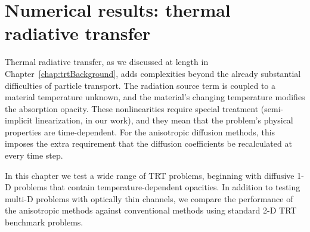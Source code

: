 \chapter{Numerical results: thermal radiative transfer}
\label{chap:trtNumericalResults}

Thermal radiative transfer, as we discussed at length in
Chapter~\ref{chap:trtBackground}, adds complexities beyond the already
substantial
difficulties of particle transport. The radiation source term is coupled to a
material temperature unknown, and the material's changing temperature modifies
the absorption opacity. These nonlinearities require special treatment
(semi-implicit linearization, in our work), and they mean that the problem's
physical properties are time-dependent. For the anisotropic diffusion methods,
this imposes the extra requirement that the diffusion coefficients be
recalculated at every time step.

In this chapter we test a wide range of TRT problems, beginning with diffusive
1-D problems that
contain temperature-dependent opacities. In addition to testing multi-D problems
with optically thin channels, we compare the performance of the anisotropic
methods against conventional methods using standard 2-D TRT benchmark problems.

